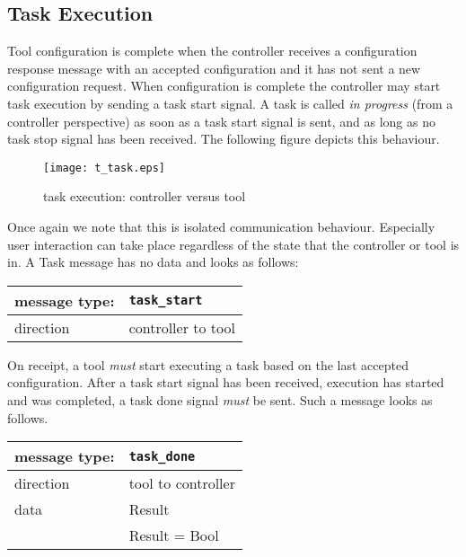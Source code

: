 \documentclass{article}
\newcommand{\msg}[1]{\texttt{#1}}
\begin{document}
  \subsection{Task Execution} \label{ss::task_execution}

   \noindent Tool configuration is complete when the controller receives a
   configuration response message with an accepted configuration and it has not
   sent a new configuration request.  When configuration is complete the
   controller may start task execution by sending a task start signal. A task
   is called \textit{in progress} (from a controller perspective) as soon as a
   task start signal is sent, and as long as no task stop signal has been
   received. The following figure depicts this behaviour.

   \begin{figure}[H]
    \begin{center}
     \texttt{[image: t\_task.eps]}
    \end{center}
    \vspace{-0.3cm}
    \caption{task execution: controller versus tool}
   \end{figure}

   \noindent Once again we note that this is isolated communication behaviour.
   Especially user interaction can take place regardless of the state that the
   controller or tool is in. A Task message has no data and looks as follows:

   \begin{table}[H]
    \begin{center}
     \begin{tabular}{|ll|}
      \hline
       message type:   & \msg{task\_start} \\
      \hline
       direction       & controller to tool \\
      \hline
     \end{tabular}
    \end{center}
    \vspace{-0.3cm}
   \end{table}

   \noindent On receipt, a tool \emph{must} start executing a task based on the
   last accepted configuration. After a task start signal has been received,
   execution has started and was completed, a task done signal \emph{must} be
   sent. Such a message looks as follows.

   \begin{table}[H]
    \begin{center}
     \begin{tabular}{|ll|}
      \hline
       message type:   & \msg{task\_done} \\
      \hline
       direction       & tool to controller \\
       data            & Result \\
                       & Result = Bool \\
      \hline
     \end{tabular}
    \end{center}
    \vspace{-0.3cm}
   \end{table}
\end{document}
